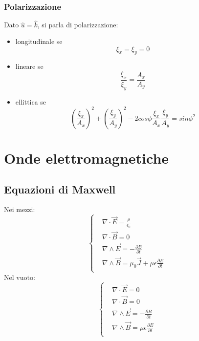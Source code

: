 \documentclass{article}
\begin{document}
\subsubsection{Polarizzazione}
Dato $\hat{u}= \hat{k}$, si parla di polarizzazione:
\begin{itemize}
    \item longitudinale se
\begin{equation}
    \xi_x=\xi_y=0
\end{equation}

 \item lineare se
\begin{equation}
  \frac{\xi_x}{\xi_y}=\frac{A_x}{A_y}
\end{equation}

\item ellittica se
\begin{equation}
    (\frac{\xi_x}{A_x})^2+(\frac{\xi_y}{A_y})^2-2cos{\phi}\frac{\xi_x}{A_x}\frac{\xi_y}{A_y}= sin{\phi}^2
\end{equation}
\end{itemize}

\section{Onde elettromagnetiche}
\subsection{Equazioni di Maxwell}
Nei mezzi:
\begin{equation}
    \left\{\begin{aligned}
        & \nabla \cdot \Vec{E}=\frac{\rho}{\epsilon_0} \\
        & \nabla \cdot \Vec{B}=0 \\
        & \nabla \wedge  \Vec{E}=-\frac{\partial B}{\partial t}\\
        & \nabla \wedge \Vec{B}= \mu_0\Vec{J}+ \mu\epsilon\frac{\partial E}{\partial t}\\
    \end{aligned}
    \right.
\end{equation}
Nel vuoto:
\begin{equation}
    \left\{\begin{aligned}
        & \nabla \cdot \Vec{E}=0 \\
        & \nabla \cdot \Vec{B}=0 \\
        & \nabla \wedge  \Vec{E}=-\frac{\partial B}{\partial t}\\
        & \nabla \wedge \Vec{B}=\mu\epsilon\frac{\partial E}{\partial t}\\
    \end{aligned}
    \right.
\end{equation}
\end{document}
